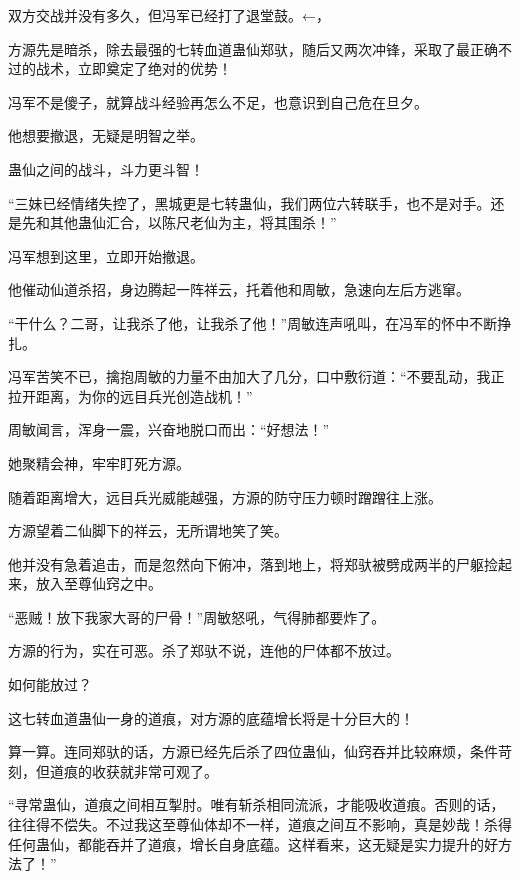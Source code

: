 
\begin{this_body}



双方交战并没有多久，但冯军已经打了退堂鼓。←，

方源先是暗杀，除去最强的七转血道蛊仙郑驮，随后又两次冲锋，采取了最正确不过的战术，立即奠定了绝对的优势！

冯军不是傻子，就算战斗经验再怎么不足，也意识到自己危在旦夕。

他想要撤退，无疑是明智之举。

蛊仙之间的战斗，斗力更斗智！

“三妹已经情绪失控了，黑城更是七转蛊仙，我们两位六转联手，也不是对手。还是先和其他蛊仙汇合，以陈尺老仙为主，将其围杀！”

冯军想到这里，立即开始撤退。

他催动仙道杀招，身边腾起一阵祥云，托着他和周敏，急速向左后方逃窜。

“干什么？二哥，让我杀了他，让我杀了他！”周敏连声吼叫，在冯军的怀中不断挣扎。

冯军苦笑不已，擒抱周敏的力量不由加大了几分，口中敷衍道：“不要乱动，我正拉开距离，为你的远目兵光创造战机！”

周敏闻言，浑身一震，兴奋地脱口而出：“好想法！”

她聚精会神，牢牢盯死方源。

随着距离增大，远目兵光威能越强，方源的防守压力顿时蹭蹭往上涨。

方源望着二仙脚下的祥云，无所谓地笑了笑。

他并没有急着追击，而是忽然向下俯冲，落到地上，将郑驮被劈成两半的尸躯捡起来，放入至尊仙窍之中。

“恶贼！放下我家大哥的尸骨！”周敏怒吼，气得肺都要炸了。

方源的行为，实在可恶。杀了郑驮不说，连他的尸体都不放过。

如何能放过？

这七转血道蛊仙一身的道痕，对方源的底蕴增长将是十分巨大的！

算一算。连同郑驮的话，方源已经先后杀了四位蛊仙，仙窍吞并比较麻烦，条件苛刻，但道痕的收获就非常可观了。

“寻常蛊仙，道痕之间相互掣肘。唯有斩杀相同流派，才能吸收道痕。否则的话，往往得不偿失。不过我这至尊仙体却不一样，道痕之间互不影响，真是妙哉！杀得任何蛊仙，都能吞并了道痕，增长自身底蕴。这样看来，这无疑是实力提升的好方法了！”


\end{this_body}
